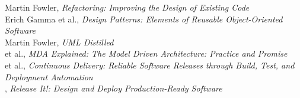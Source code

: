 \documentclass[nobrand,anonymous,nodate,nosecurity]{huawei}
\begin{document}
\begin{multicols}{2}
{Martin Fowler}, \emph{Refactoring: Improving the Design of Existing Code}\\[3pt]
{Erich Gamma et al.}, \emph{Design Patterns: Elements of Reusable Object-Oriented Software}\\[3pt]
{Martin Fowler}, \emph{UML Distilled}\\[3pt]
{ et al.}, \emph{MDA Explained: The Model Driven Architecture: Practice and Promise}\\[3pt]
{ et al.}, \emph{Continuous Delivery: Reliable Software Releases through Build, Test, and Deployment Automation}\\[3pt]
{}, \emph{Release It!: Design and Deploy Production-Ready Software}\\[3pt]
\end{multicols}
\end{document}
